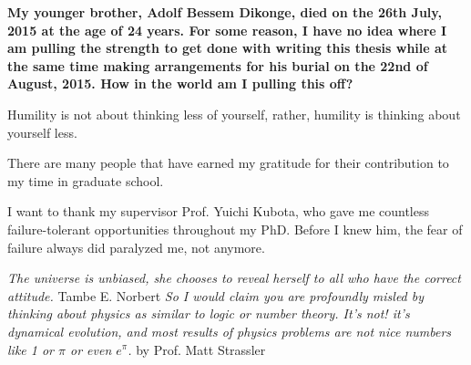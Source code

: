 \textbf{ My younger brother, Adolf Bessem Dikonge, died on the 26th July, 2015 at the age of 24 years.
For some reason, I have no idea where I am pulling the strength to get done with writing this thesis while at the same time making arrangements for his burial on the 22nd of August, 2015. How in the world am I pulling this off? }

Humility is not about thinking less of yourself, rather, humility is thinking about yourself less.


There are many people that have earned my gratitude for their contribution to my
time in graduate school. 

I want to thank my supervisor Prof. Yuichi Kubota, who gave me countless failure-tolerant opportunities
throughout my PhD. Before I knew him, the fear of failure always did paralyzed me, not anymore.

\textit{The universe is unbiased, she chooses to reveal herself to all who have the correct attitude.}
\newline
\textsf{Tambe E. Norbert}
\newline
\textit{So I would claim you are profoundly misled by thinking about physics as similar to logic or number theory. It’s not! it’s dynamical evolution, and most results of physics problems are not nice numbers like 1 or $\pi$ or even $e^{\pi}$.}
\newline
\textsf{by Prof. Matt Strassler}

